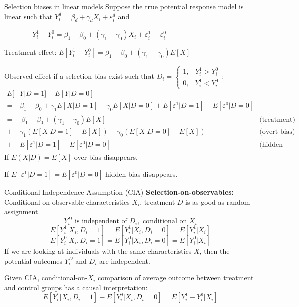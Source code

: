 \documentclass[handout]{beamer}
\begin{document}
\begin{frame}{Selection biases in linear models}
Suppose the true potential response model is linear such that $Y_i^d=\beta_d+\gamma_d X_i+\varepsilon_i^d$
and

$\qquad\qquad Y_i^1-Y_i^0=\beta_1-\beta_0+(\gamma_1-\gamma_0)X_i+\varepsilon_i^1-\varepsilon_i^0 $\pause

Treatment effect: $E[Y_i^1-Y_i^0]=\beta_1-\beta_0+(\gamma_1-\gamma_0)E[X] $\medskip\pause

Observed effect if a selection bias exist such that $D_i=\begin{cases}
1,&Y_i^1>Y_i^0\\ 0, & Y_i^1<Y_i^0
\end{cases}$:
\begin{align*}
E[&Y|D=1]-E[Y|D=0]&\\
=&{\scriptstyle \beta_1-\beta_0+\gamma_1E[X|D=1]-\gamma_0E[X|D=0]+ E[\varepsilon^1|D=1]-E[\varepsilon^0|D=0]}&\\
= & \ \beta_1-\beta_0+(\gamma_1-\gamma_0)E[X]&\text{(treatment)}\\
+ & \gamma_1(E[X|D=1]-E[X])-\gamma_0(E[X|D=0]-E[X]) &\text{(overt bias)}\\
+ & E[\varepsilon^1|D=1]-E[\varepsilon^0|D=0] &\text{(hidden bias)}
\end{align*}\pause
If $E(X|D)=E[X]$ over bias disappears.

If $E[\varepsilon^1|D=1]=E[\varepsilon^0|D=0]$ hidden bias disappears.
\end{frame}

\begin{frame}{Conditional Independence Assumption (CIA)}
\textbf{Selection-on-observables:} Conditional on observable characteristics $X_i$, treatment $D$ is as good as random assignment.
\[Y_i^D\text{ is independent of }D_i, \text{ conditional on } X_i\]
\[E[Y_i^1|X_i,D_i=1]=E[Y_i^1|X_i,D_i=0]=E[Y_i^1|X_i] \]
\[E[Y_i^0|X_i,D_i=1]=E[Y_i^0|X_i,D_i=0]=E[Y_i^0|X_i] \]
If we are looking at individuals with the same characteristics $X$, then the potential outcomes $Y^D_i$ and $D_i$ are independent. \medskip

Given CIA, conditional-on-$X_i$ comparison of average outcome between treatment and control groups has a causal interpretation:
\[E[Y_i^1|X_i,D_i = 1] - E [Y_i^0|X_i,D_i = 0] = E [Y_i^1- Y_i^0|X_i]\]

\end{frame}
\end{document}
